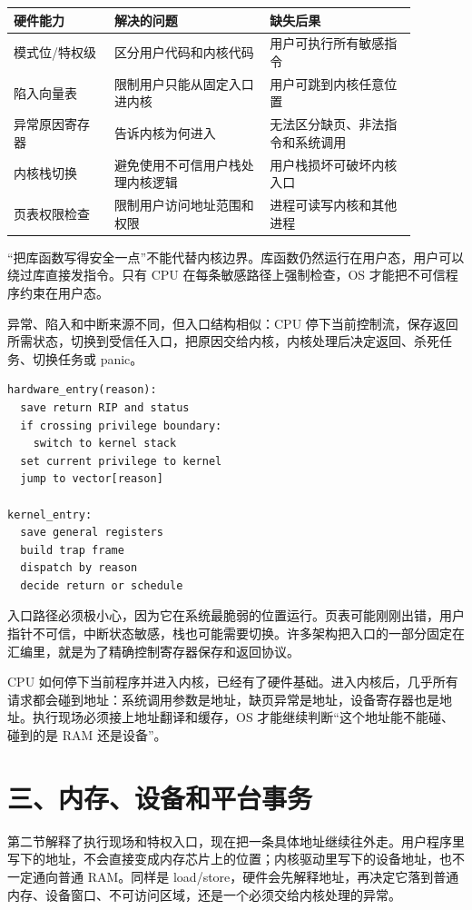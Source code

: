 \begin{longtable}{p{0.22\linewidth}p{0.34\linewidth}p{0.32\linewidth}}
\toprule
硬件能力 & 解决的问题 & 缺失后果 \\
\midrule
模式位/特权级 & 区分用户代码和内核代码 & 用户可执行所有敏感指令 \\
陷入向量表 & 限制用户只能从固定入口进内核 & 用户可跳到内核任意位置 \\
异常原因寄存器 & 告诉内核为何进入 & 无法区分缺页、非法指令和系统调用 \\
内核栈切换 & 避免使用不可信用户栈处理内核逻辑 & 用户栈损坏可破坏内核入口 \\
页表权限检查 & 限制用户访问地址范围和权限 & 进程可读写内核和其他进程 \\
\bottomrule
\end{longtable}

“把库函数写得安全一点”不能代替内核边界。库函数仍然运行在用户态，用户可以绕过库直接发指令。只有 CPU 在每条敏感路径上强制检查，OS 才能把不可信程序约束在用户态。

异常、陷入和中断来源不同，但入口结构相似：CPU 停下当前控制流，保存返回所需状态，切换到受信任入口，把原因交给内核，内核处理后决定返回、杀死任务、切换任务或 panic。

\begin{lstlisting}
hardware_entry(reason):
  save return RIP and status
  if crossing privilege boundary:
    switch to kernel stack
  set current privilege to kernel
  jump to vector[reason]

kernel_entry:
  save general registers
  build trap frame
  dispatch by reason
  decide return or schedule
\end{lstlisting}

入口路径必须极小心，因为它在系统最脆弱的位置运行。页表可能刚刚出错，用户指针不可信，中断状态敏感，栈也可能需要切换。许多架构把入口的一部分固定在汇编里，就是为了精确控制寄存器保存和返回协议。

CPU 如何停下当前程序并进入内核，已经有了硬件基础。进入内核后，几乎所有请求都会碰到地址：系统调用参数是地址，缺页异常是地址，设备寄存器也是地址。执行现场必须接上地址翻译和缓存，OS 才能继续判断“这个地址能不能碰、碰到的是 RAM 还是设备”。

\section{三、内存、设备和平台事务}

第二节解释了执行现场和特权入口，现在把一条具体地址继续往外走。用户程序里写下的地址，不会直接变成内存芯片上的位置；内核驱动里写下的设备地址，也不一定通向普通 RAM。同样是 load/store，硬件会先解释地址，再决定它落到普通内存、设备窗口、不可访问区域，还是一个必须交给内核处理的异常。

